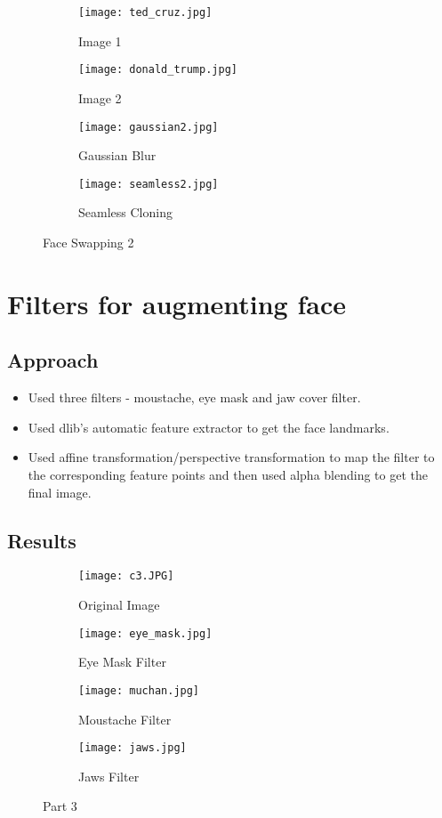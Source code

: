 \documentclass{article}
\begin{document}
\begin{figure}[!ht]
\begin{subfigure}{.24\textwidth}
\centering
\texttt{[image: ted\_cruz.jpg]}
\caption{Image 1}
\end{subfigure}
\begin{subfigure}{.24\textwidth}
\centering
\texttt{[image: donald\_trump.jpg]}
\caption{Image 2}
\end{subfigure}
\begin{subfigure}{.24\textwidth}
\centering
\texttt{[image: gaussian2.jpg]}
\caption{Gaussian Blur}
\end{subfigure}
\begin{subfigure}{.24\textwidth}
\centering
\texttt{[image: seamless2.jpg]}
\caption{Seamless Cloning}
\end{subfigure}
\caption{Face Swapping 2}
\end{figure}

\clearpage

\section{Filters for augmenting face}
\subsection{Approach}
\begin{itemize}
    \item Used three filters - moustache, eye mask and jaw cover filter.
    \item Used dlib's automatic feature extractor to get the face landmarks.
    \item Used affine transformation/perspective transformation to map the filter to the corresponding feature points and then used alpha blending to get the final image.
\end{itemize}

\subsection{Results}

\begin{figure}[!ht]
\begin{subfigure}{.5\textwidth}
\centering
\texttt{[image: c3.JPG]}
\caption{Original Image}
\end{subfigure}
\begin{subfigure}{.5\textwidth}
\centering
\texttt{[image: eye\_mask.jpg]}
\caption{Eye Mask Filter}
\end{subfigure}
\begin{subfigure}{.5\textwidth}
\centering
\texttt{[image: muchan.jpg]}
\caption{Moustache Filter}
\end{subfigure}
\begin{subfigure}{.5\textwidth}
\centering
\texttt{[image: jaws.jpg]}
\caption{Jaws Filter}
\end{subfigure}
\caption{Part 3}
\end{figure}
\end{document}
